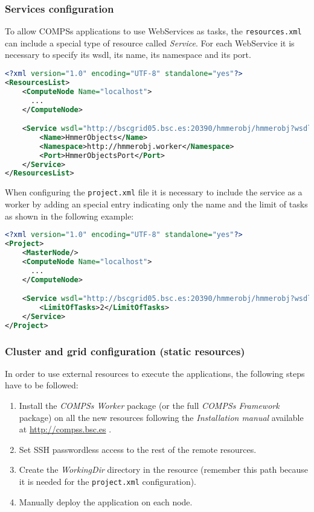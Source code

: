 \subsubsection{Services configuration}
To allow COMPSs applications to use WebServices as tasks, the \texttt{resources.xml} can include a special type of resource called
\textit{Service}. For each WebService it is necessary to specify its wsdl, its name, its namespace and
its port.
\begin{lstlisting}[language=xml]
<?xml version="1.0" encoding="UTF-8" standalone="yes"?>
<ResourcesList>
    <ComputeNode Name="localhost">
      ...
    </ComputeNode>

    <Service wsdl="http://bscgrid05.bsc.es:20390/hmmerobj/hmmerobj?wsdl">
        <Name>HmmerObjects</Name>
        <Namespace>http://hmmerobj.worker</Namespace>
        <Port>HmmerObjectsPort</Port>
    </Service>
</ResourcesList>
\end{lstlisting}

When configuring the \texttt{project.xml} file it is necessary to include the service as a worker by adding an
special entry indicating only the name and the limit of tasks as shown in the following example:
\begin{lstlisting}[language=xml]
<?xml version="1.0" encoding="UTF-8" standalone="yes"?>
<Project>
    <MasterNode/>
    <ComputeNode Name="localhost">
      ...
    </ComputeNode>

    <Service wsdl="http://bscgrid05.bsc.es:20390/hmmerobj/hmmerobj?wsdl">
        <LimitOfTasks>2</LimitOfTasks>
    </Service>
</Project>
\end{lstlisting}

\subsubsection{Cluster and grid configuration (static resources)}
In order to use external resources to execute the applications, the following steps have to be followed:

\begin{enumerate}
 \item Install the \textit{COMPSs Worker} package (or the full \textit{COMPSs Framework} package) on all the new
 resources following the \textit{Installation manual} available at \url{http://compss.bsc.es} .
 \item Set SSH passwordless access to the rest of the remote resources.
 \item Create the \textit{WorkingDir} directory in the resource (remember this path because it is needed
 for the \texttt{project.xml} configuration).
 \item Manually deploy the application on each node.
\end{enumerate}

